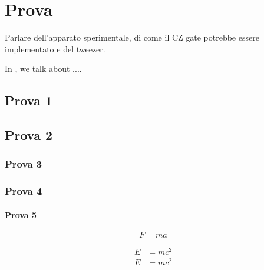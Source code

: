 \documentclass[\mainpath/main/main.tex]{subfiles}
\begin{document}


\chapter{Prova}
\label{ch:prova}

Parlare dell'apparato sperimentale, di come il CZ gate potrebbe essere implementato e del tweezer.

In , we talk about ....

\section{Prova 1}

\lipsum

\section{Prova 2}

\lipsum

\subsection{Prova 3}

\lipsum[3]

\subsection{Prova 4}

\lipsum[3]

\subsubsection{Prova 5}

\begin{equation}
  F = ma
\end{equation}

\lipsum[4]

\begin{subequations}
\begin{align}
  E &= m c^2 \\
  E &= m c^2
\end{align}
\end{subequations}
\end{document}
